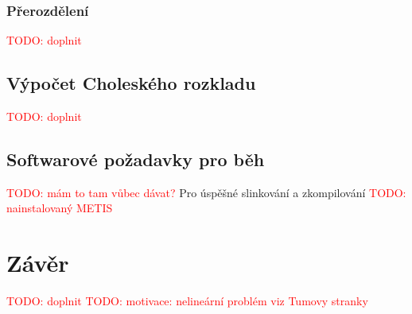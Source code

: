 \documentclass[11pt,american,czech,oneside]{book}
\theoremstyle{plain}
\theoremstyle{definition}
\newcommand{\TODO}[1]{\textcolor{red}{TODO: #1}}
\begin{document}
\subsection{Přerozdělení}
\TODO{doplnit}

\section{Výpočet Choleského rozkladu}
\TODO{doplnit}

\section{Softwarové požadavky pro běh}
\TODO{mám to tam vůbec dávat?}
Pro úspěšné slinkování a zkompilování
\TODO{nainstalovaný METIS}


\chapter*{Závěr}
\TODO{doplnit}
\TODO{motivace: nelineární problém viz Tumovy stranky}


\newpage


\end{document}
